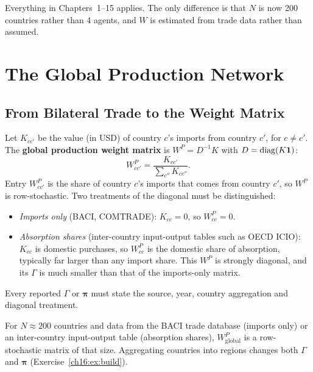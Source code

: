 \documentclass[../structural_economics_book.tex]{subfiles}
\begin{document}
Everything in Chapters~1--15 applies. The only difference is that $N$ is now 200 countries rather than 4 agents, and $W$ is estimated from trade data rather than assumed.


\section{The Global Production Network}
\label{ch16:sec:global_WP}

\subsection{From Bilateral Trade to the Weight Matrix}

\begin{definition}\label{ch16:def:global_WP}
Let $K_{cc'}$ be the value (in USD) of country $c$'s imports from country $c'$, for $c \neq c'$. The \textbf{global production weight matrix} is $W^P = D^{-1}K$ with $D = \operatorname{diag}(K\mathbf{1})$:
\begin{equation}\label{ch16:eq:global_WP}
W^P_{cc'} = \frac{K_{cc'}}{\sum_{c''} K_{cc''}}.
\end{equation}
Entry $W^P_{cc'}$ is the share of country $c$'s imports that comes from country $c'$, so $W^P$ is row-stochastic. Two treatments of the diagonal must be distinguished:
\begin{itemize}
\item \emph{Imports only} (BACI, COMTRADE): $K_{cc} = 0$, so $W^P_{cc} = 0$.
\item \emph{Absorption shares} (inter-country input-output tables such as OECD ICIO): $K_{cc}$ is domestic purchases, so $W^P_{cc}$ is the domestic share of absorption, typically far larger than any import share. This $W^P$ is strongly diagonal, and its $\Gamma$ is much smaller than that of the imports-only matrix.
\end{itemize}
Every reported $\Gamma$ or $\boldsymbol{\pi}$ must state the source, year, country aggregation and diagonal treatment.
\end{definition}

For $N \approx 200$ countries and data from the BACI trade database (imports only) or an inter-country input-output table (absorption shares), $W^P_{\text{global}}$ is a row-stochastic matrix of that size. Aggregating countries into regions changes both $\Gamma$ and $\boldsymbol{\pi}$ (Exercise~\ref{ch16:ex:build}).
\end{document}
